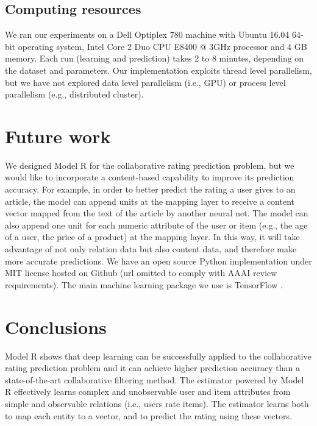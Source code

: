 \documentclass[sigconf]{acmart}
\begin{document}
\subsection{Computing resources}
We ran our experiments on a Dell Optiplex 780 machine with Ubuntu 16.04 64-bit 
operating system, Intel Core 2 Duo CPU E8400 @ 3GHz processor and 4 GB memory.
Each run (learning and prediction) takes 2 to 8 minutes,
depending on the dataset and parameters.
Our implementation exploits thread level parallelism, but we have not explored 
data level parallelism (i.e., GPU) or process level parallelism (e.g., 
distributed cluster).

\section{Future work}
We designed Model R for the collaborative rating prediction problem,
but we would like to incorporate a content-based capability to improve its 
prediction accuracy.
For example, in order to better predict the rating a user gives to an article,
the model can append units at the mapping layer to receive a content vector 
mapped from the text of the article by another neural net.
The model can also append one unit for each numeric attribute of the user or 
item (e.g., the age of a user, the price of a product) at the mapping layer.
In this way, it will take advantage of not only relation data but also content 
data, and therefore make more accurate predictions.
We have an open source Python implementation under MIT license hosted on Github 
(url omitted to comply with AAAI review requirements).
The main machine learning package we use is TensorFlow 
\cite{abadi2016tensorflow}.

\section{Conclusions}
Model R shows that deep learning can be successfully applied to the 
collaborative rating prediction problem
and it can achieve higher prediction accuracy than a state-of-the-art 
collaborative filtering method.
The estimator powered by Model R effectively learns complex and unobservable 
user and item attributes from simple and observable relations (i.e., users rate 
items).
The estimator learns both to map each entity to a vector, and to predict 
the rating using these vectors.



\end{document}
